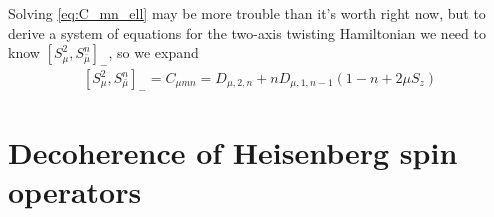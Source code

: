 \documentclass[aps,notitlepage,nofootinbib,11pt]{revtex4-1}
\newcommand{\p}[1]{\left(#1\right)} %
\renewcommand{\sp}[1]{\left[#1\right]} %
\newcommand{\bmu}{{\bar\mu}}
\newcommand{\1}{\mathds{1}}
\begin{document}
\vspace{3cm}

Solving \eqref{eq:C_mn_ell} may be more trouble than it's worth
right now, but to derive a system of equations for the two-axis
twisting Hamiltonian we need to know $\sp{S_\mu^2,S_\bmu^n}_-$, so we
expand
\begin{align}
  \sp{S_\mu^2,S_\bmu^n}_-
  = C_{\mu mn}
  = D_{\mu,2,n} + n D_{\mu,1,n-1} \p{1 - n + 2\mu S_z}
\end{align}


\newpage

\section{Decoherence of Heisenberg spin operators}
\label{sec:decoherence}
\end{document}
